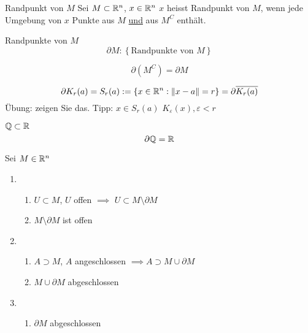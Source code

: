 \begin{Def}{Randpunkt von $M$}
  Sei $M\subset\mathbb{R}^n$, $x\in\mathbb{R}^n$ $x$ heisst Randpunkt von $M$, wenn jede Umgebung von $x$ Punkte aus $M$ \underline{und} aus $M^C$ enthält.
\end{Def}
\begin{Not}{Randpunkte von $M$}
  \[\partial M:\left\{ \text{Randpunkte von } M \right\}\]
\end{Not}
\begin{Bem}
  \[\partial(M^C)=\partial M\]
\end{Bem}
\begin{Bsp}
  \[\partial K_r(a)=S_r(a):=\left\{ x\in\mathbb{R}^n:\left\| x-a \right\|=r \right\}=\partial\overline{K_r(a)}\]
  Übung: zeigen Sie das. Tipp: $x\in S_r(a)$ $K_\varepsilon(x), \varepsilon<r$
\end{Bsp}
\begin{Bsp}
  $\mathbb{Q}\subset\mathbb{R}$
  \[\partial\mathbb{Q}=\mathbb{R}\]
\end{Bsp}
\begin{Sat}
  Sei $M\in\mathbb{R}^n$
  \begin{enumerate}
    \item \begin{enumerate}
        \item $U\subset M$, $U$ offen $\implies$ $U\subset M\setminus \partial M$
        \item $M\setminus\partial M$ ist offen
      \end{enumerate}
    \item\begin{enumerate}
        \item $A\supset M$, $A$ angeschlossen $\implies A\supset M \cup \partial M$
        \item $M\cup \partial M$ abgeschlossen
      \end{enumerate}
    \item\begin{enumerate}
        \item $\partial M$ abgeschlossen
      \end{enumerate}
  \end{enumerate}
\end{Sat}
